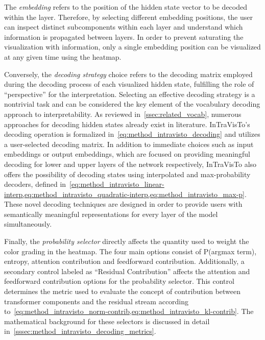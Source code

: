 The \emph{embedding} refers to the position of the hidden state vector to be decoded within the layer.
Therefore, by selecting different embedding positions, the user can inspect distinct subcomponents within each layer and understand which information is propagated between layers.
In order to prevent saturating the visualization with information, only a single embedding position can be visualized at any given time using the heatmap.

Conversely, the \emph{decoding strategy} choice refers to the decoding matrix employed during the decoding process of each visualized hidden state, fulfilling the role of ``perspective'' for the interpretation.
Selecting an effective decoding strategy is a nontrivial task and can be considered the key element of the vocabulary decoding approach to interpretability.
As reviewed in~\cref{ssec:related_vocab}, numerous approaches for decoding hidden states already exist in literature.
InTraVisTo's decoding operation is formalized in~\cref{eq:method_intravisto_decoding} and utilizes a user-selected decoding matrix.
In addition to immediate choices such as input embeddings or output embeddings, which are focused on providing meaningful decoding for lower and upper layers of the network respectively, InTraVisTo also offers the possibility of decoding states using interpolated and max-probability decoders, defined in~\cref{eq:method_intravisto_linear-interp,eq:method_intravisto_quadratic-interp,eq:method_intravisto_max-p}.
These novel decoding techniques are designed in order to provide users with semantically meaningful representations for every layer of the model simultaneously.

Finally, the \emph{probability selector} directly affects the quantity used to weight the color grading in the heatmap.
The four main options consist of P(argmax term), entropy, attention contribution and feedforward contribution. %
Additionally, a secondary control labeled as ``Residual Contribution'' affects the attention and feedforward contribution options for the probability selector.
This control determines the metric used to evaluate the concept of contribution between transformer components and the residual stream according to~\cref{eq:method_intravisto_norm-contrib,eq:method_intravisto_kl-contrib}.
The mathematical background for these selectors is discussed in detail in~\cref{sssec:method_intravisto_decoding_metrics}.

